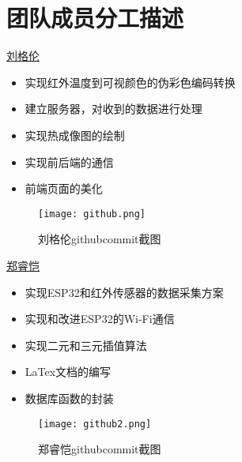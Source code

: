 \chapter{团队成员分工描述}

\underline{刘格伦}
\begin{itemize}
    \item 实现红外温度到可视颜色的伪彩色编码转换
    \item 建立服务器，对收到的数据进行处理
    \item 实现热成像图的绘制
    \item 实现前后端的通信
    \item 前端页面的美化
    \end{itemize}
\begin{figure}[htbp]
        \centering
        \texttt{[image: github.png]}
        \caption{刘格伦githubcommit截图}\label{fig:github}
        \vspace{\baselineskip}
        \end{figure}
\underline{郑睿恺}
\begin{itemize}
    \item 实现ESP32和红外传感器的数据采集方案
    \item 实现和改进ESP32的Wi-Fi通信
    \item 实现二元和三元插值算法
    \item LaTex文档的编写
    \item 数据库函数的封装
    \end{itemize}
    \begin{figure}[htbp]
        \centering
        \texttt{[image: github2.png]}
        \caption{郑睿恺githubcommit截图}\label{fig:github2}
        \vspace{\baselineskip}
        \end{figure}



